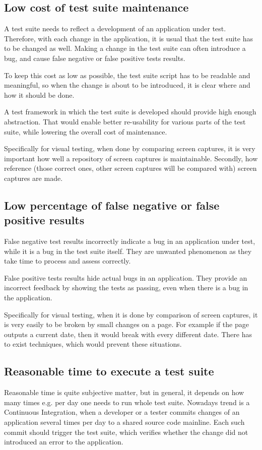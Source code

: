 \documentclass[11pt,oneside,final]{fithesis2}
\begin{document}
    \subsection{Low cost of test suite maintenance}
    A test suite needs to reflect a development of an application under test. Therefore, with each change in the application, it is usual that the test suite has to be changed as well.
    Making a change in the test suite can often introduce a bug, and cause false negative or false positive tests results.
    
    To keep this cost as low as possible, the test suite script has to be readable and meaningful, so when the change is about to be introduced, it is clear where and how it should be done.
    
    A test framework in which the test suite is developed should provide high enough abstraction. That would enable better re-usability for various parts of the test suite, 
    while lowering the overall cost of maintenance.
    
    Specifically for visual testing, when done by comparing screen captures, it is very important how well a repository of screen captures is maintainable. Secondly, 
    how reference (those correct ones, other screen captures will be compared with) screen captures are made.
    
    \subsection{Low percentage of false negative or false positive results}
    False negative test results incorrectly indicate a bug in an application under test, while it is a bug in the test suite itself. They are unwanted phenomenon as they take time to process
    and assess correctly.
    
    False positive tests results hide actual bugs in an application. They provide an incorrect feedback by showing the tests as passing, even when there is a bug in the application.
    
    Specifically for visual testing, when it is done by comparison of screen captures, it is very easily to be broken by small changes on a page. For example if the page outputs a current
    date, then it would break with every different date. There has to exist techniques, which would prevent these situations.
    
    \subsection{Reasonable time to execute a test suite}
    Reasonable time is quite subjective matter, but in general, it depends on how many times e.g. per day one needs to run whole test suite. Nowadays trend is a Continuous Integration,
    when a developer or a tester commits changes of an application several times per day to a shared source code mainline. Each such commit should trigger the test suite, which verifies 
    whether the change did not introduced an error to the application.
    
\end{document}
